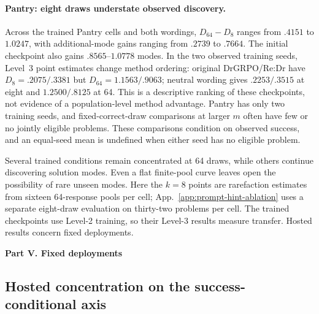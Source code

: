 \documentclass{article}
\newcommand{\1}{\mathbf 1}
\theoremstyle{remark}
\theoremstyle{definition}
\theoremstyle{plain}
\begin{document}
\paragraph{Pantry: eight draws understate observed discovery.}
Across the trained Pantry cells and both wordings, $D_{64}-D_8$ ranges
from $.4151$ to $1.0247$, with additional-mode gains ranging from $.2739$
to $.7664$. The initial checkpoint also gains $.8565$--$1.0778$ modes.
In the two observed training seeds, Level~3 point estimates change
method ordering: original DrGRPO/Re:Dr have $D_8=.2075/.3381$
but $D_{64}=1.1563/.9063$; neutral wording gives $.2253/.3515$ at eight
and $1.2500/.8125$ at 64. This is a descriptive ranking of these checkpoints,
not evidence of a population-level method advantage. Pantry has only two
training seeds, and fixed-correct-draw comparisons at larger $m$ often have
few or no jointly eligible problems. These comparisons condition on observed
success, and an equal-seed mean is undefined when either seed has no eligible
problem.

Several trained conditions remain concentrated at 64 draws, while others
continue discovering solution modes. Even a flat finite-pool curve leaves
open the possibility of rare unseen modes. Here the $k=8$ points are
rarefaction estimates from sixteen 64-response pools per cell; App.~\ref{app:prompt-hint-ablation}
uses a separate eight-draw evaluation on thirty-two problems per cell.
The trained checkpoints use Level-2 training, so their Level-3 results
measure transfer. Hosted results concern fixed deployments.






\clearpage
{}
\begin{center}\large\textbf{Part V. Fixed deployments}\end{center}



\subsection{Hosted concentration on the success-conditional axis}
\label{app:hosted-mode-diversity}
\end{document}
